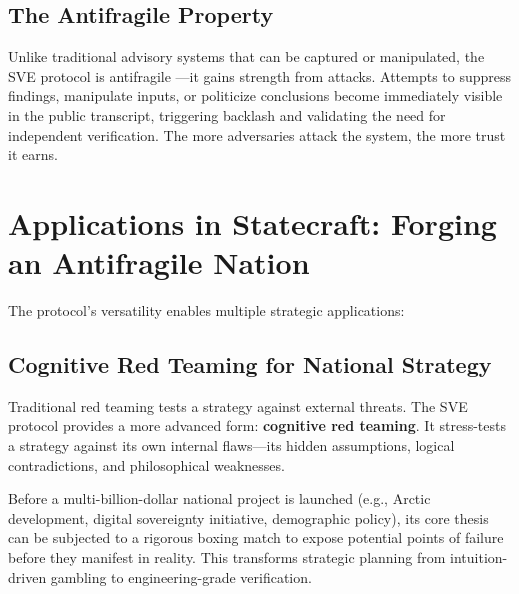 \documentclass[11pt,a4paper]{article}
\begin{document}
\begin{small}
\subsection{The Antifragile Property}
Unlike traditional advisory systems that can be captured or manipulated, the SVE protocol is antifragile \citep{Taleb2012}—it gains strength from attacks. Attempts to suppress findings, manipulate inputs, or politicize conclusions become immediately visible in the public transcript, triggering backlash and validating the need for independent verification. The more adversaries attack the system, the more trust it earns.

\section{Applications in Statecraft: Forging an Antifragile Nation}
The protocol's versatility enables multiple strategic applications:

\subsection{Cognitive Red Teaming for National Strategy}
Traditional red teaming tests a strategy against external threats. The SVE protocol provides a more advanced form: \textbf{cognitive red teaming}. It stress-tests a strategy against its own internal flaws—its hidden assumptions, logical contradictions, and philosophical weaknesses.

Before a multi-billion-dollar national project is launched (e.g., Arctic development, digital sovereignty initiative, demographic policy), its core thesis can be subjected to a rigorous boxing match to expose potential points of failure before they manifest in reality. This transforms strategic planning from intuition-driven gambling to engineering-grade verification.

\begin{figure}[h!]
\centering
{}
\end{figure}
\end{small}
\end{document}
